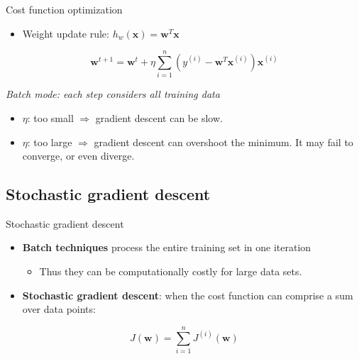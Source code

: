 \documentclass[serif, aspectratio=169]{beamer}
\begin{document}
\begin{frame}{Cost function optimization}

\begin{itemize}
    \item Weight update rule: $h_w(\mathbf{x}) = \mathbf{w}^T \mathbf{x}$
\end{itemize}

\[
\mathbf{w}^{t+1} = \mathbf{w}^t + \eta \sum_{i=1}^{n} \left( y^{(i)} - \mathbf{w}^T \mathbf{x}^{(i)} \right) \mathbf{x}^{(i)}
\]
\begin{center}
    \textit{Batch mode: each step considers all training data}
\end{center}

\begin{itemize}
    \item $\eta$: too small $\Rightarrow$ gradient descent can be slow.
    \item $\eta$: too large $\Rightarrow$ gradient descent can overshoot the minimum. It may fail to converge, or even diverge.
\end{itemize}

\end{frame}


\subsection{Stochastic gradient descent}
\begin{frame}{Stochastic gradient descent}

\begin{itemize}
    \item \textbf{Batch techniques} process the entire training set in one iteration
    \begin{itemize}
        \item Thus they can be computationally costly for large data sets.
    \end{itemize}
    \item \textbf{Stochastic gradient descent}: when the cost function can comprise a sum over data points:
\end{itemize}

\[
J(\mathbf{w}) = \sum_{i=1}^{n} J^{(i)}(\mathbf{w})
\]

\end{frame}
\end{document}
